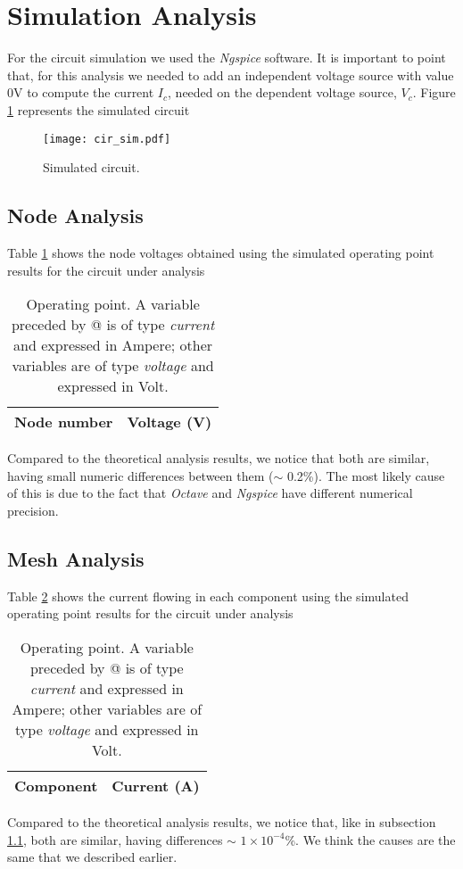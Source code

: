 \section{Simulation Analysis}
\label{sec:simulation}

For the circuit simulation we used the \textit{Ngspice} software. It is important to point that, for this analysis we needed to add an independent voltage source with value 0V to compute the current $I_c$, needed on the dependent voltage source, $V_c$. Figure \ref{fig:cir_sim} represents the simulated circuit

\begin{figure}[H] \centering
\texttt{[image: cir\_sim.pdf]}
\caption{Simulated circuit.}
\label{fig:cir_sim}
\end{figure}

\subsection{Node Analysis}
\label{subsec:node_sim}

Table \ref{tab:node_sim} shows the node voltages obtained using the simulated operating point results for the circuit under analysis
\begin{table}[H]
  \centering
  \begin{tabular}{|l|r|}
    \hline    
    {\bf Node number} & {\bf Voltage (V)} \\ \hline
    
  \end{tabular}
  \caption{Operating point. A variable preceded by @ is of type {\em current}
    and expressed in Ampere; other variables are of type {\it voltage} and expressed in
    Volt.}
  \label{tab:node_sim}
\end{table}
Compared to the theoretical analysis results, we notice that both are similar, having small numeric differences between them ($\sim$ 0.2\%). The most likely cause of this is due to the fact that \textit{Octave} and \textit{Ngspice} have different numerical precision.

\subsection{Mesh Analysis}

Table \ref{tab:mesh_sim} shows the current flowing in each component using the simulated operating point results for the circuit under analysis
\begin{table}[H]
  \centering
  \begin{tabular}{|l|r|}
    \hline    
    {\bf Component} & {\bf Current (A)} \\ \hline
    
  \end{tabular}
  \caption{Operating point. A variable preceded by @ is of type {\em current}
    and expressed in Ampere; other variables are of type {\it voltage} and expressed in
    Volt.}
  \label{tab:mesh_sim}
\end{table}

Compared to the theoretical analysis results, we notice that, like in subsection \ref{subsec:node_sim}, both are similar, having differences $\sim$ $1\times10^{-4}$\%. We think the causes are the same that we described earlier.


